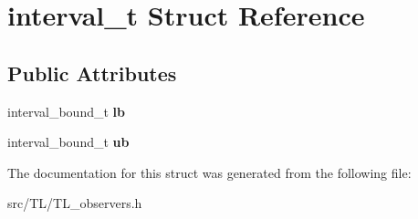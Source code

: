 \hypertarget{structinterval__t}{}\section{interval\+\_\+t Struct Reference}
\label{structinterval__t}
\subsection*{Public Attributes}
\begin{DoxyCompactItemize}
\item 
\mbox{\label{structinterval__t_a96793b7f4351ccba2ce711c610ea8998}} 
interval\+\_\+bound\+\_\+t {\bfseries lb}
\item 
\mbox{\label{structinterval__t_aaa4a3924f7c3bdfde42efd1bfad71a26}} 
interval\+\_\+bound\+\_\+t {\bfseries ub}
\end{DoxyCompactItemize}


The documentation for this struct was generated from the following file\+:\begin{DoxyCompactItemize}
\item 
src/\+T\+L/T\+L\+\_\+observers.\+h\end{DoxyCompactItemize}

